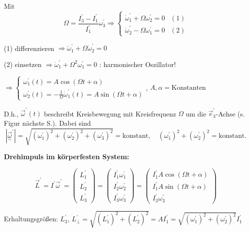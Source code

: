 \documentclass[10pt, letterpaper]{article}
\begin{document}
Mit 
$$\Omega = \frac{I_3^\prime-I_1^\prime}{I_1^\prime} \omega_3^\prime \Rightarrow \begin{cases} \dot{\omega}_1^\prime + \Omega \omega_2^\prime = 0 & (1) \\ \dot{\omega}_2^\prime - \Omega \omega_1^\prime = 0 & (2) \end{cases}$$

(1) differenzieren $\Rightarrow \ddot{\omega}_1^\prime + \Omega \dot{\omega}_2^\prime = 0$

(2) einsetzen $\Rightarrow \ddot{\omega}_1^\prime + \Omega^2 \omega_1^\prime = 0$ : harmonischer Oszillator!

$\Rightarrow \begin{cases} \omega_1^\prime(t) = A \cos(\Omega t + \alpha) \\ \omega_2^\prime(t) = -\frac{1}{\Omega}\dot{\omega}_1^\prime(t) = A \sin(\Omega t + \alpha) \end{cases}$, $A, \alpha = \text{Konstanten}$

D.h., $\vec{\omega}^\prime(t)$ beschreibt Kreisbewegung mit Kreisfrequenz $\Omega$ um die $\vec{e}_3^\prime$-Achse (s. Figur nächste S.). Dabei sind
\[|\vec{\underset{\sim}{\omega}}^\prime| = \sqrt{(\omega_1^\prime)^2+(\omega_2^\prime)^2+(\omega_3^\prime)^2} = \text{konstant}, \quad (\omega_1^\prime)^2+(\omega_2^\prime)^2 = \text{konstant}.\]





\textbf{Drehimpuls im körperfesten System:}

\[
\vec{L}^\prime = I^\prime \vec{\omega}^\prime 
= \begin{pmatrix} L_1^\prime \\ L_2^\prime \\ L_3^\prime \end{pmatrix} 
= \begin{pmatrix} I_1^\prime \omega_1^\prime \\ I_2^\prime \omega_2^\prime \\ I_3^\prime \omega_3^\prime \end{pmatrix} 
= \begin{pmatrix} I_1^\prime A \cos(\Omega t + \alpha) \\ I_1^\prime A \sin(\Omega t + \alpha) \\ I_3^\prime \omega_3^\prime \end{pmatrix}
\]

Erhaltungsgrößen: $L_3^\prime$, $L_\perp^\prime = \sqrt{(L_1^\prime)^2+(L_2^\prime)^2} = AI_1^\prime = \sqrt{(\omega_1^\prime)^2+(\omega_2^\prime)^2}I_1^\prime$
\end{document}
